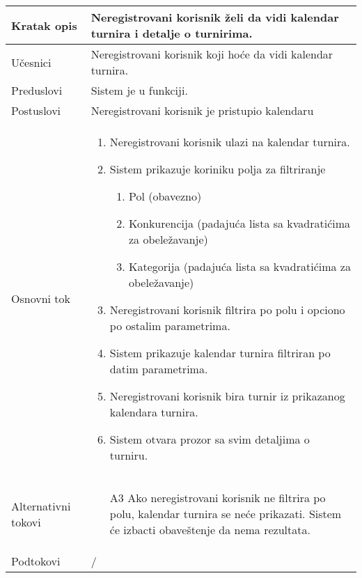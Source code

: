\documentclass{article}
\begin{document}
    \begin{longtable}{| p{} | p{} |} 
        \hline
            Kratak opis & Neregistrovani korisnik želi da vidi kalendar turnira i detalje o turnirima.\\ 
        \hline    
            Učesnici & Neregistrovani korisnik koji hoće da vidi kalendar turnira. \\
        \hline
            Preduslovi &  Sistem je u funkciji.\\
        \hline  
            Postuslovi &  Neregistrovani korisnik je pristupio kalendaru\\
        \hline
            Osnovni tok & 
                \begin{enumerate}
                    \item Neregistrovani korisnik ulazi na kalendar turnira.
                    \item Sistem prikazuje koriniku polja za filtriranje \begin{enumerate}
                        \item Pol (obavezno)
                        \item Konkurencija (padajuća lista sa kvadratićima za obeležavanje)
                        \item Kategorija (padajuća lista sa kvadratićima za obeležavanje)
                    \end{enumerate}
                    \item Neregistrovani korisnik filtrira po polu i opciono po ostalim parametrima.
                    \item Sistem prikazuje kalendar turnira filtriran po datim parametrima.
                    \item Neregistrovani korisnik bira turnir iz prikazanog kalendara turnira.
                    \item Sistem otvara prozor sa svim detaljima o turniru.
                \end{enumerate}\\
        \hline
            Alternativni tokovi & \begin{itemize}
                \item[A3] Ako neregistrovani korisnik ne filtrira po polu, kalendar turnira se neće prikazati. Sistem će izbacti obaveštenje da nema rezultata.
            \end{itemize}\\
        \hline
            Podtokovi & /\\

\end{longtable}
\end{document}
